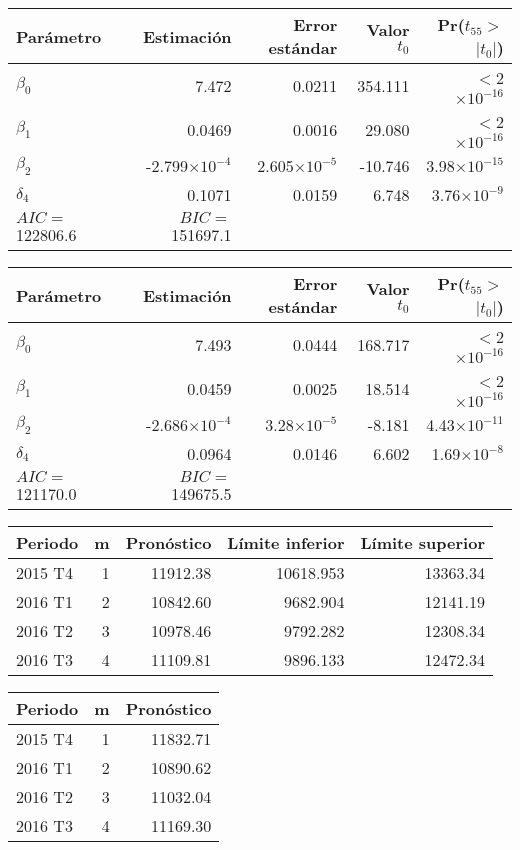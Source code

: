 \documentclass[11pt]{article}
\begin{document}
\begin{table}[ht]
\centering
\begin{tabular}{lrrrr}
\hline
 Parámetro & Estimación & Error estándar & Valor $t_0$ & Pr($t_{55}>$$|t_0|$) \\ 
  \hline
$\beta_0$ & 7.472 & 0.0211 & 354.111 & $<$2$\times10^{-16}$ \\ 
  $\beta_1$ & 0.0469 & 0.0016 & 29.080 & $<$2$\times10^{-16}$ \\ 
  $\beta_2$ & -2.799$\times10^{-4}$ & 2.605$\times10^{-5}$ & -10.746 & 3.98$\times10^{-15}$ \\ 
  $\delta_4$ & 0.1071 & 0.0159 & 6.748 & 3.76$\times10^{-9}$ \\ 
   \hline
	$AIC=$ 122806.6 & $BIC=$ 151697.1 & & & \\
	\hline
\end{tabular}
\end{table}

\begin{table}[ht]
\centering
\begin{tabular}{lrrrr}
\hline
 Parámetro& Estimación & Error estándar & Valor $t_0$ & Pr($t_{55}>$$|t_0|$) \\ 
  \hline
$\beta_0$ & 7.493 & 0.0444 & 168.717 & $<$2$\times10^{-16}$ \\ 
  $\beta_1$ & 0.0459 & 0.0025 & 18.514 & $<$2$\times10^{-16}$ \\ 
  $\beta_2$ & -2.686$\times10^{-4}$ & 3.28$\times10^{-5}$ & -8.181 & 4.43$\times10^{-11}$ \\ 
  $\delta_4$ & 0.0964 & 0.0146 & 6.602 & 1.69$\times10^{-8}$ \\ 
   \hline
	$AIC=$ 121170.0 & $BIC=$ 149675.5 & & & \\
	\hline
\end{tabular}
\end{table}

\begin{table}[ht]
\centering
\begin{tabular}{lrrrr}
\hline
Periodo & m & Pronóstico & Límite inferior & Límite superior \\
\hline
2015 T4 & 1 & 11912.38 & 10618.953 & 13363.34 \\
2016 T1 & 2 & 10842.60 & 9682.904 & 12141.19 \\
2016 T2 & 3 & 10978.46 & 9792.282 & 12308.34 \\
2016 T3 & 4 & 11109.81 & 9896.133 & 12472.34 \\
\hline
\end{tabular}
\end{table}

\begin{table}[ht]
\centering
\begin{tabular}{lrr}
\hline
Periodo & m & Pronóstico \\
\hline
2015 T4 & 1 & 11832.71 \\
2016 T1 & 2 & 10890.62 \\
2016 T2 & 3 & 11032.04 \\
2016 T3 & 4 & 11169.30 \\
\hline
\end{tabular}
\end{table}
\end{document}
